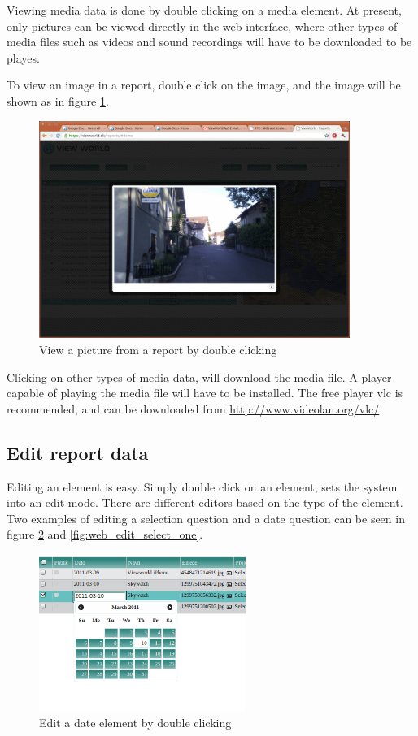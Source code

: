 \documentclass[a4paper, 12pt, final]{article}
\begin{document}
Viewing media data is done by double clicking on a media element. At present, only pictures can be viewed directly in the web interface, where other types of media files such as videos and sound recordings will have to be downloaded to be playes.

To view an image in a report, double click on the image, and the image will be shown as in figure \ref{fig:web_view_picture}.

\begin{figure}[H]
  \centering
  \includegraphics[width=0.9\textwidth]{pics/web_view_picture.png}
  \caption{View a picture from a report by double clicking}
  \label{fig:web_view_picture}
\end{figure}

Clicking on other types of media data, will download the media file. A player capable of playing the media file will have to be installed. The free player vlc is recommended, and can be downloaded from \url{http://www.videolan.org/vlc/}

\subsection{Edit report data}

Editing an element is easy. Simply double click on an element, sets the system into an edit mode. There are different editors based on the type of the element.
Two examples of editing a selection question and a date question can be seen in figure \ref{fig:web_edit_date} and \ref{fig:web_edit_select_one}.

\begin{figure}[H]
  \centering
  \includegraphics[width=0.6\textwidth]{pics/web_edit_date.png}
  \caption{Edit a date element by double clicking}
  \label{fig:web_edit_date}
\end{figure}
\end{document}
